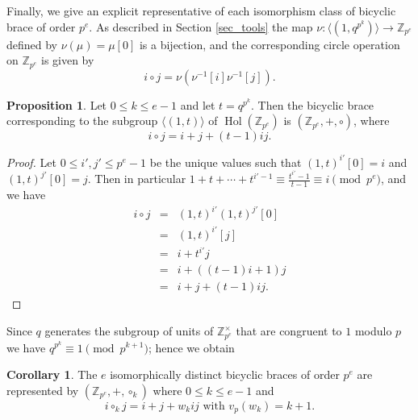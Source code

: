 \documentclass[reqno]{amsart}
\theoremstyle{definition}
\newtheorem{proposition}[theorem]{Proposition}
\newtheorem{corollary}[theorem]{Corollary}
\newcommand{\Z}{\mathbb{Z}}
\DeclareMathOperator{\Hol}{\mbox{Hol}}
\begin{document}
Finally, we give an explicit representative of each isomorphism class of bicyclic brace of order $ p^{e} $. As described in Section \ref{sec_tools} the map $ \nu : \langle (1,q^{p^{k}}) \rangle \rightarrow \Z_{p^{e}} $ defined by $ \nu(\mu) = \mu[0] $ is a bijection, and the corresponding circle operation on $ \Z_{p^{e}} $ is given by 
\[ i \circ j = \nu ( \nu^{-1}[i] \nu^{-1}[j] ). \]

\begin{proposition} \label{prop_circle_p}
Let $ 0 \leq k \leq e-1 $ and let $ t = q^{p^{k}} $. Then the bicyclic brace corresponding to the subgroup $ \langle (1,t) \rangle $ of $ \Hol(\Z_{p^{e}}) $ is $ (\Z_{p^{e}},+,\circ) $, where
\[ i \circ j = i+j+(t-1)ij. \]
\end{proposition}
\begin{proof}
Let $ 0 \leq i', j' \leq p^{e}-1 $ be the unique values such that $ (1,t)^{i'}[0]=i $ and $ (1,t)^{j'}[0]=j $. Then in particular $ 1+t+\cdots + t^{i'-1} \equiv \frac{t^{i'}-1}{t-1} \equiv i \pmod{p^{e}} $, and we have
\begin{eqnarray*}
i \circ j & = & (1,t)^{i'}(1,t)^{j'}[0] \\
& = & (1,t)^{i'}[j] \\
& = & i+ t^{i'}j \\
& = & i+((t-1)i+1)j \\
& = & i+j+(t-1)ij. 
\end{eqnarray*}
\end{proof}

Since $ q $ generates the subgroup of units of $ \Z_{p^{e}}^{\times} $ that are congruent to $ 1 $ modulo $ p $ we have $ q^{p^{k}} \equiv 1 \pmod{p^{k+1}} $; hence we obtain

\begin{corollary} \label{cor_circle_p}
The $ e $ isomorphically distinct bicyclic braces of order $ p^{e} $ are represented by $ (\Z_{p^{e}},+,\circ_{k}) $ where $ 0 \leq k \leq e-1 $ and
\[ i \circ_{k} j = i + j + w_{k}ij \mbox{ with } v_{p}(w_{k})=k+1. \]
\end{corollary}

\end{document}

